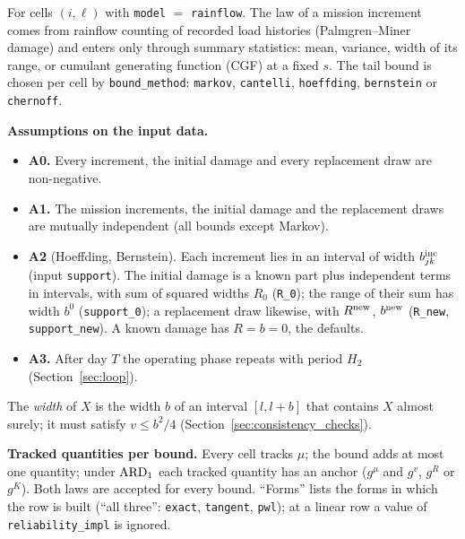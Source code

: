 For cells $(i,\ell)$ with \texttt{model} $=$ \texttt{rainflow}. The law of a
mission increment comes from rainflow counting of recorded load histories
(Palmgren--Miner damage) and enters only through summary statistics: mean,
variance, width of its range, or cumulant generating function (CGF) at a fixed
$s$. The tail bound is chosen per cell by \texttt{bound\_method}: \texttt{markov},
\texttt{cantelli}, \texttt{hoeffding}, \texttt{bernstein} or \texttt{chernoff}.

\textbf{Assumptions on the input data.}
\begin{itemize}[leftmargin=1.5em, nosep]
  \item \textbf{A0.} Every increment, the initial damage and every replacement draw
        are non-negative.
  \item \textbf{A1.} The mission increments, the initial damage and the replacement
        draws are mutually independent (all bounds except Markov).
  \item \textbf{A2} (Hoeffding, Bernstein). Each increment lies in an interval of
        width $b^{\mathrm{inc}}_{jk}$ (input \texttt{support}). The initial damage is a
        known part plus independent terms in intervals, with sum of squared widths
        $R_0$ (\texttt{R\_0}); the range of their sum has width $b^0$ (\texttt{support\_0}); a
        replacement draw likewise, with $R^{\mathrm{new}}$, $b^{\mathrm{new}}$ (\texttt{R\_new},
        \texttt{support\_new}). A known damage has $R = b = 0$, the defaults.
  \item \textbf{A3.} After day $T$ the operating phase repeats with period $H_2$
        (Section~\ref{sec:loop}).
\end{itemize}
The \emph{width} of $X$ is the width $b$ of an interval $[l, l + b]$ that contains
$X$ almost surely; it must satisfy $v \leq b^2/4$ (Section~\ref{sec:consistency_checks}).

\textbf{Tracked quantities per bound.} Every cell tracks $\mu$; the bound adds at
most one quantity; under $\mathrm{ARD}_{1}$ each tracked quantity has an anchor ($g^{\mu}$
and $g^{v}$, $g^{R}$ or $g^{K}$). Both laws are accepted for every bound. ``Forms''
lists the forms in which the row is built (``all three'': \texttt{exact},
\texttt{tangent}, \texttt{pwl}); at a linear row a value of
\texttt{reliability\_impl} is ignored.

